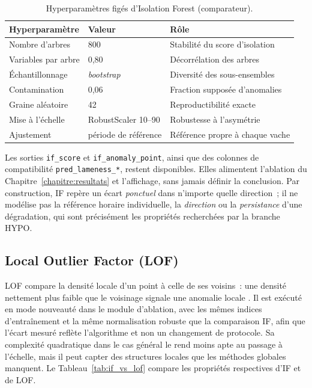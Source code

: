 \begin{table}[H]
  \centering
  \caption{Hyperparamètres figés d'Isolation Forest (comparateur).}
  \label{tab:if_hyperparams}
  \small
  \begin{tabular}{p{}p{}p{}}
    \toprule
    Hyperparamètre & Valeur & Rôle \\
    \midrule
    Nombre d'arbres & 800 & Stabilité du score d'isolation \\
    Variables par arbre & 0,80 & Décorrélation des arbres \\
    Échantillonnage & \textit{bootstrap} & Diversité des sous-ensembles \\
    Contamination & 0,06 & Fraction supposée d'anomalies \\
    Graine aléatoire & 42 & Reproductibilité exacte \\
    Mise à l'échelle & RobustScaler 10--90 & Robustesse à l'asymétrie \\
    Ajustement & période de référence & Référence propre à chaque vache \\
    \bottomrule
  \end{tabular}
\end{table}

Les sorties \texttt{if\_score} et \texttt{if\_anomaly\_point}, ainsi que des colonnes de
compatibilité \texttt{pred\_lameness\_*}, restent disponibles. Elles alimentent l'ablation
du Chapitre~\ref{chapitre:resultats} et l'affichage, sans jamais définir la conclusion. Par
construction, IF repère un écart \emph{ponctuel} dans n'importe quelle
direction~; il ne modélise pas la référence horaire individuelle, la \emph{direction} ou
la \emph{persistance} d'une dégradation, qui sont précisément les propriétés recherchées par
la branche HYPO.

\subsection{Local Outlier Factor (LOF)}
LOF compare la densité locale d'un point à celle de ses voisins~: une
densité nettement plus faible que le voisinage signale une anomalie locale
\citep{breunig2000lof}. Il est exécuté en mode nouveauté dans le module d'ablation,
avec les mêmes indices d'entraînement et la même normalisation robuste que la comparaison
IF, afin que l'écart mesuré reflète l'algorithme et non un changement de
protocole. Sa complexité quadratique dans le cas général le rend moins apte au passage à
l'échelle, mais il peut capter des structures locales que les méthodes globales manquent.
Le Tableau~\ref{tab:if_vs_lof} compare les propriétés respectives d'IF et de LOF.

